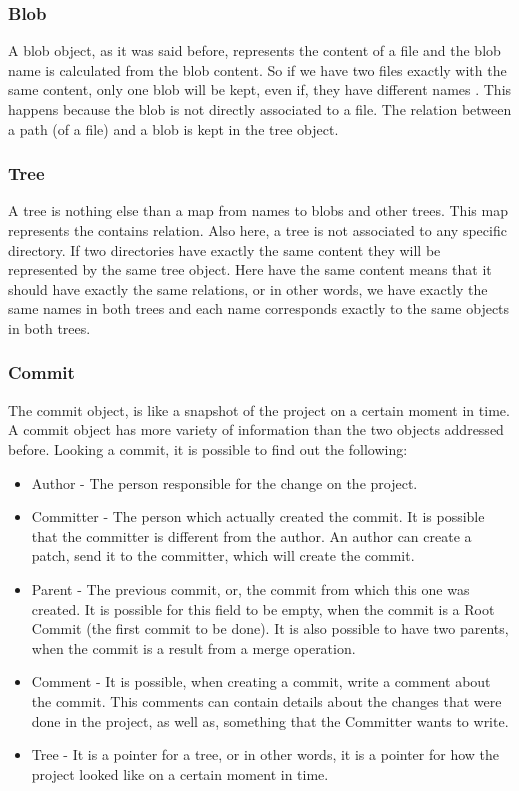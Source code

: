 \subsubsection{Blob}
A blob object, as it was said before, represents the content of a
file and the blob name is calculated from the blob content. So if we
have two files exactly with the same content, only one blob will be
kept, even if, they have different names . This happens because the
blob is not directly associated to a file. The relation between a path
(of a file) and a blob is kept in the tree object. 

\subsubsection{Tree}
A tree is nothing else than a map from names to blobs and other trees. This map
represents the contains relation. Also here, a tree is not associated to any 
specific directory.
If two directories have exactly the same content they will be
represented by the same tree object. Here have the same content means
that it should have exactly the same relations, or in other words, we
have exactly the same names in both trees and each name corresponds exactly
to the same objects in both trees. 

\subsubsection{Commit}
The commit object, is like a snapshot of the project on a certain moment in
time. A commit object has more variety of information than the two
objects addressed before. Looking a commit, it is possible to find out
the following:
\begin{itemize}
   \item Author - The person responsible for the change on the
   project.
   \item Committer - The person which actually created the commit. It
   is possible that the committer is different from the author. An
   author can create a patch, send it to the committer,
   which will create the commit.
   \item Parent - The previous commit, or, the commit from which this
   one was created. It is possible for this field to be empty, when 
   the commit is a Root Commit (the first commit to be done). 
   It is also possible to have two parents, when the commit is a result
   from a merge operation.
   \item Comment - It is possible, when creating a commit, write a
   comment about the commit. This comments can contain details about
   the changes that were done in the project, as well as, something
   that the Committer wants to write.
   \item Tree - It is a pointer for a tree, or in other words, it is a pointer
   for how the project looked like on a certain moment in time. 
\end{itemize}

